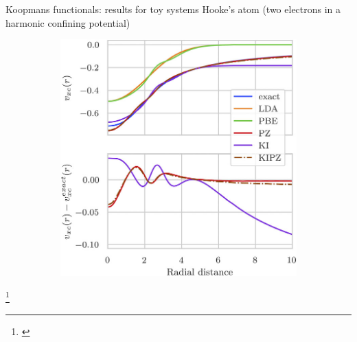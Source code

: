 \documentclass[xcolor=table,aspectratio=169]{beamer}
\newcommand\blfootcite[1]{%
  \begingroup
  \renewcommand\thefootnote{}\footnote{\hspace{-4ex}\cite{#1}}%
  \addtocounter{footnote}{-1}%
  \endgroup
}
\newcommand{\backupend}{
   \setcounter{framenumber}{\value{finalframe}}
}
\numberwithin{equation}{section}
\begin{document}
\begin{frame}{Koopmans functionals: results for toy systems}
   Hooke's atom (two electrons in a harmonic confining potential)

   \begin{figure}[t]
      \begin{subfigure}{0.4\textwidth}
         \includegraphics[width=\columnwidth]{figures/schubert_vxc.jpeg}
      \end{subfigure}
      \begin{subfigure}{0.4\textwidth}
      \end{subfigure}
   \end{figure}

   \vspace{-4ex}

   \blfootcite{Schubert2023}
\end{frame}

\backupend
\end{document}
